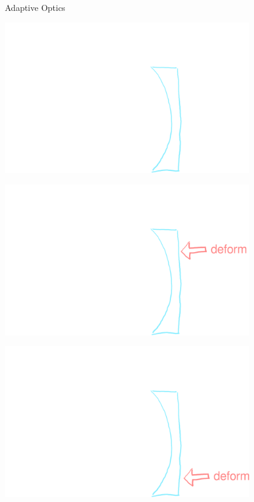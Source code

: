 \documentclass{beamer}
\begin{document}
\begin{frame}{Adaptive Optics}
    \begin{overprint}
        \begin{center}
            \includegraphics[width=0.8\textwidth]{figures/ao-1}
        \end{center}
        \begin{center}
            \includegraphics[width=0.8\textwidth]{figures/ao-2}
        \end{center}
        \begin{center}
            \includegraphics[width=0.8\textwidth]{figures/ao-3}
        \end{center}
    \end{overprint}
\end{frame}
\end{document}
